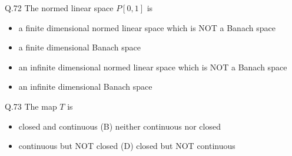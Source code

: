 \documentclass{article}
\begin{document}
																																																																																																															       \bigskip

																																																																																																															       Q.72 \quad The normed linear space $P[0,1]$ is
																																																																																																															       \begin{itemize}
																																																																																																															           \item[(A)] a finite dimensional normed linear space which is NOT a Banach space
																																																																																																																       \item[(B)] a finite dimensional Banach space
																																																																																																																           \item[(C)] an infinite dimensional normed linear space which is NOT a Banach space
																																																																																																																	       \item[(D)] an infinite dimensional Banach space
																																																																																																																	       \end{itemize}

																																																																																																																	       \bigskip

																																																																																																																	       Q.73 \quad The map $T$ is
																																																																																																																	       \begin{itemize}
																																																																																																																	           \item[(A)] closed and continuous \hspace{5cm} (B) neither continuous nor closed
																																																																																																																		       
																																																																																																																		           \item[(C)] continuous but NOT closed \hspace{4cm} (D) closed but NOT continuous
																																																																																																																			       
																																																																																																																			       \end{itemize}
\end{document}
